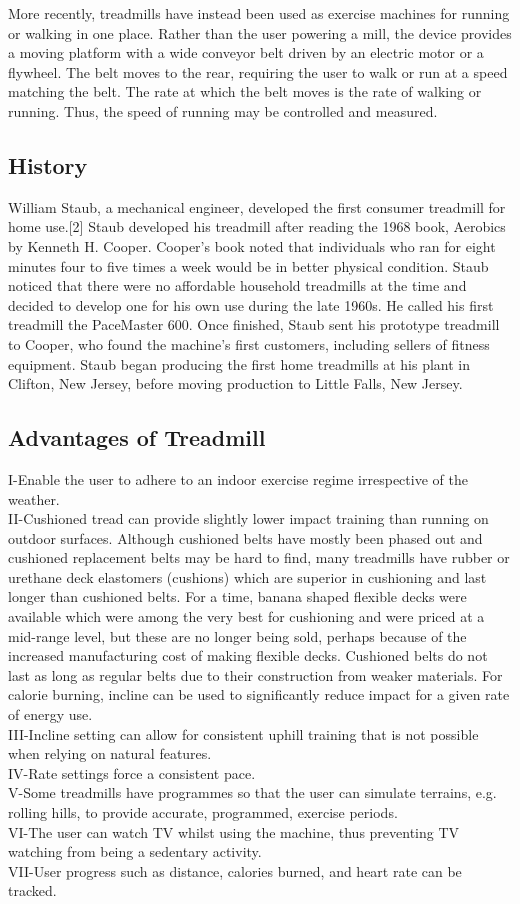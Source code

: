 \documentclass[12pt]{article}
\begin{document}
More recently, treadmills have instead been used as exercise machines for running or walking in one place. Rather than the user powering a mill, the device provides a moving platform with a wide conveyor belt driven by an electric motor or a flywheel. The belt moves to the rear, requiring the user to walk or run at a speed matching the belt. The rate at which the belt moves is the rate of walking or running. Thus, the speed of running may be controlled and measured.
\subsection{History} 
William Staub, a mechanical engineer, developed the first consumer treadmill for home use.[2] Staub developed his treadmill after reading the 1968 book, Aerobics by Kenneth H. Cooper. Cooper's book noted that individuals who ran for eight minutes four to five times a week would be in better physical condition. Staub noticed that there were no affordable household treadmills at the time and decided to develop one for his own use during the late 1960s. He called his first treadmill the PaceMaster 600. Once finished, Staub sent his prototype treadmill to Cooper, who found the machine's first customers, including sellers of fitness equipment.
Staub began producing the first home treadmills at his plant in Clifton, New Jersey, before moving production to Little Falls, New Jersey.
\subsection{Advantages of Treadmill}
I-Enable the user to adhere to an indoor exercise regime irrespective of the weather.\\
II-Cushioned tread can provide slightly lower impact training than running on outdoor surfaces. Although cushioned belts have mostly been phased out and cushioned replacement belts may be hard to find, many treadmills have rubber or urethane deck elastomers (cushions) which are superior in cushioning and last longer than cushioned belts. For a time, banana shaped flexible decks were available which were among the very best for cushioning and were priced at a mid-range level, but these are no longer being sold, perhaps because of the increased manufacturing cost of making flexible decks. Cushioned belts do not last as long as regular belts due to their construction from weaker materials. For calorie burning, incline can be used to significantly reduce impact for a given rate of energy use.\\
III-Incline setting can allow for consistent uphill training that is not possible when relying on natural features.\\
IV-Rate settings force a consistent pace.\\
V-Some treadmills have programmes so that the user can simulate terrains, e.g. rolling hills, to provide accurate, programmed, exercise periods.\\
VI-The user can watch TV whilst using the machine, thus preventing TV watching from being a sedentary activity.\\
VII-User progress such as distance, calories burned, and heart rate can be tracked.
\end{document}
